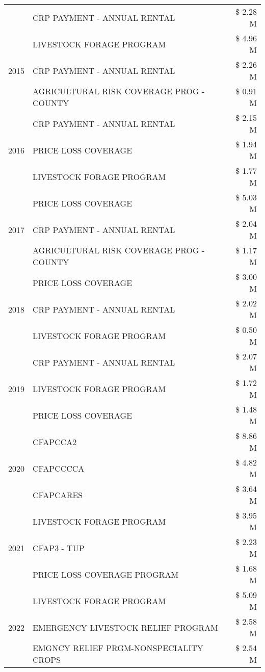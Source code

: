 \begin{tabular}{llr}
 & CRP PAYMENT - ANNUAL RENTAL & \$ 2.28 M \\
\cline{1-3}
\multirow[t]{3}{*}{2015} & LIVESTOCK FORAGE PROGRAM & \$ 4.96 M \\
 & CRP PAYMENT - ANNUAL RENTAL & \$ 2.26 M \\
 & AGRICULTURAL RISK COVERAGE PROG - COUNTY & \$ 0.91 M \\
\cline{1-3}
\multirow[t]{3}{*}{2016} & CRP PAYMENT - ANNUAL RENTAL & \$ 2.15 M \\
 & PRICE LOSS COVERAGE & \$ 1.94 M \\
 & LIVESTOCK FORAGE PROGRAM & \$ 1.77 M \\
\cline{1-3}
\multirow[t]{3}{*}{2017} & PRICE LOSS COVERAGE & \$ 5.03 M \\
 & CRP PAYMENT - ANNUAL RENTAL & \$ 2.04 M \\
 & AGRICULTURAL RISK COVERAGE PROG - COUNTY & \$ 1.17 M \\
\cline{1-3}
\multirow[t]{3}{*}{2018} & PRICE LOSS COVERAGE & \$ 3.00 M \\
 & CRP PAYMENT - ANNUAL RENTAL & \$ 2.02 M \\
 & LIVESTOCK FORAGE PROGRAM & \$ 0.50 M \\
\cline{1-3}
\multirow[t]{3}{*}{2019} & CRP PAYMENT - ANNUAL RENTAL & \$ 2.07 M \\
 & LIVESTOCK FORAGE PROGRAM & \$ 1.72 M \\
 & PRICE LOSS COVERAGE & \$ 1.48 M \\
\cline{1-3}
\multirow[t]{3}{*}{2020} & CFAPCCA2 & \$ 8.86 M \\
 & CFAPCCCCA & \$ 4.82 M \\
 & CFAPCARES & \$ 3.64 M \\
\cline{1-3}
\multirow[t]{3}{*}{2021} & LIVESTOCK FORAGE PROGRAM & \$ 3.95 M \\
 & CFAP3 - TUP & \$ 2.23 M \\
 & PRICE LOSS COVERAGE PROGRAM & \$ 1.68 M \\
\cline{1-3}
\multirow[t]{3}{*}{2022} & LIVESTOCK FORAGE PROGRAM & \$ 5.09 M \\
 & EMERGENCY LIVESTOCK RELIEF PROGRAM & \$ 2.58 M \\
 & EMGNCY RELIEF PRGM-NONSPECIALITY CROPS & \$ 2.54 M \\
\cline{1-3}
\bottomrule
\end{tabular}

